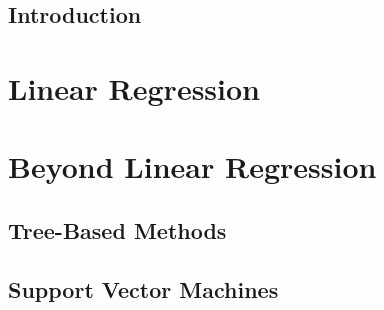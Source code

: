\documentclass[11pt]{book}
\begin{document}
\tableofcontents
\chapter{Introduction}
\part{Linear Regression}

\part{Beyond Linear Regression}

\chapter{Tree-Based Methods}
\chapter{Support Vector Machines}
\end{document}
